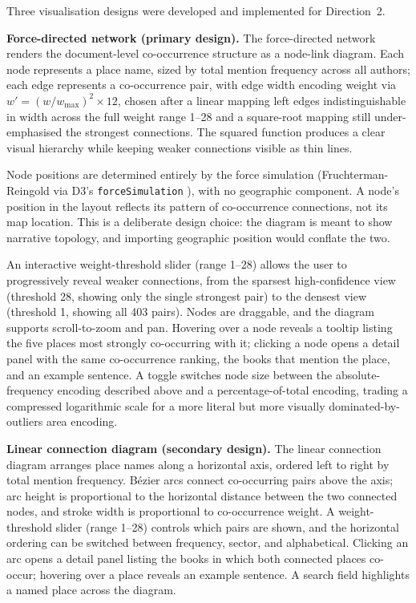 \documentclass[logo,msc]{infthesis}
\begin{document}
Three visualisation designs were developed and implemented for Direction~2.
 
\textbf{Force-directed network (primary design).} The force-directed network renders the document-level co-occurrence structure as a node-link diagram. Each node represents a place name, sized by total mention frequency across all authors; each edge represents a co-occurrence pair, with edge width encoding weight via $w' = (w / w_{\max})^2 \times 12$, chosen after a linear mapping left edges indistinguishable in width across the full weight range 1--28 and a square-root mapping still under-emphasised the strongest connections. The squared function produces a clear visual hierarchy while keeping weaker connections visible as thin lines.
 
Node positions are determined entirely by the force simulation (Fruchterman-Reingold \cite{fruchterman1991} via D3's \texttt{forceSimulation} \cite{bostock2011}), with no geographic component. A node's position in the layout reflects its pattern of co-occurrence connections, not its map location. This is a deliberate design choice: the diagram is meant to show narrative topology, and importing geographic position would conflate the two.
 
An interactive weight-threshold slider (range 1--28) allows the user to progressively reveal weaker connections, from the sparsest high-confidence view (threshold 28, showing only the single strongest pair) to the densest view (threshold 1, showing all 403 pairs). Nodes are draggable, and the diagram supports scroll-to-zoom and pan. Hovering over a node reveals a tooltip listing the five places most strongly co-occurring with it; clicking a node opens a detail panel with the same co-occurrence ranking, the books that mention the place, and an example sentence. A toggle switches node size between the absolute-frequency encoding described above and a percentage-of-total encoding, trading a compressed logarithmic scale for a more literal but more visually dominated-by-outliers area encoding.
 
\textbf{Linear connection diagram (secondary design).} The linear connection diagram arranges place names along a horizontal axis, ordered left to right by total mention frequency. Bézier arcs connect co-occurring pairs above the axis; arc height is proportional to the horizontal distance between the two connected nodes, and stroke width is proportional to co-occurrence weight. A weight-threshold slider (range 1--28) controls which pairs are shown, and the horizontal ordering can be switched between frequency, sector, and alphabetical. Clicking an arc opens a detail panel listing the books in which both connected places co-occur; hovering over a place reveals an example sentence. A search field highlights a named place across the diagram.
 
\end{document}
